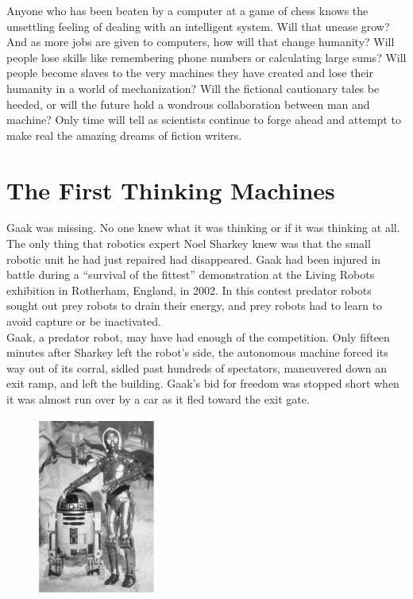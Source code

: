 \documentclass[12pt]{article}
\begin{document}
 Anyone who has been beaten by a computer at a game of chess knows the unsettling feeling of dealing with an intelligent system. Will that unease grow? And as more jobs are given to computers, how will that change humanity? Will people lose skills like remembering phone numbers or calculating large sums? Will people become slaves to the very machines they have created and lose their humanity in a world of mechanization? Will the fictional cautionary tales be heeded, or will the future hold a wondrous collaboration between man and machine? Only time will tell as scientists continue to forge ahead and attempt to make real the amazing dreams of fiction writers.\\
\Huge
\section{The First Thinking Machines}
\center
\large\flushleft
Gaak was missing. No one knew what it was thinking or if it was thinking at all. The only thing that robotics expert Noel Sharkey knew was that the small robotic unit he had just repaired had disappeared. Gaak had been injured in battle during a “survival of the fittest” demonstration at the Living Robots exhibition in Rotherham, England, in 2002. In this contest predator robots sought out prey robots to drain their energy, and prey robots had to learn to avoid capture or be inactivated.\\
 Gaak, a predator robot, may have had enough of the competition. Only fifteen minutes after Sharkey left the robot’s side, the autonomous machine forced its way out of its corral, sidled past hundreds of spectators, maneuvered down an exit ramp, and left the building. Gaak’s bid for freedom was stopped short when it was almost run over by a car as it fled toward the exit gate.
\begin{figure}[h]
\center
  \includegraphics[width=4cm]{Image/IMG_20200125_232951.jpg}
  \caption{}
 
\end{figure}
\end{document}

